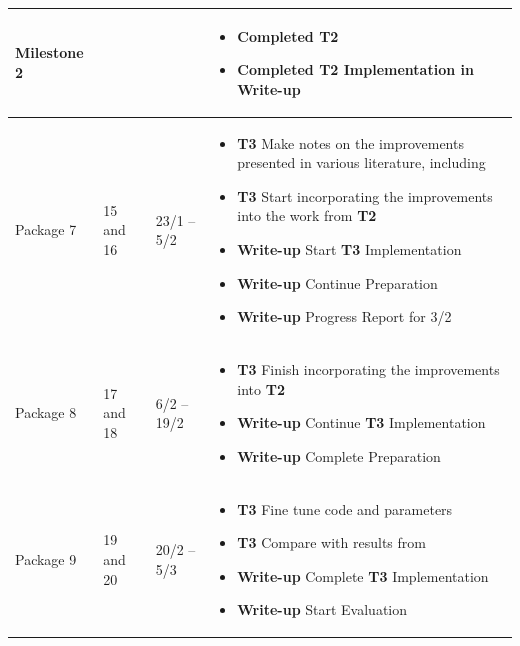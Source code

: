\documentclass{article}
\begin{document}
\begin{longtable}{p{2.5cm}p{1.5cm}P{2.5cm}P{6.8cm}}
    \textbf{Milestone 2} &
    &
    &
    \begin{itemize}[label={--},noitemsep,leftmargin=*,topsep=0pt,partopsep=0pt]
      \item Completed \textbf{T2}
      \item Completed \textbf{T2} Implementation in \textbf{Write-up}
    \end{itemize}\\
    \hline
    
    Package 7 &
    15 and 16  &
    23/1 -- 5/2 &
    \begin{itemize}[label={--},noitemsep,leftmargin=*,topsep=0pt,partopsep=0pt]
      \item \textbf{T3} Make notes on the improvements presented in various literature, including \cite{Nichol-2021}
      \item \textbf{T3} Start incorporating the improvements into the work from \textbf{T2}
      \item \textbf{Write-up} Start \textbf{T3} Implementation
      \item \textbf{Write-up} Continue Preparation
      \item \textbf{Write-up} Progress Report for 3/2
    \end{itemize}\\
    \hline
    
    Package 8 &
    17 and 18  &
    6/2 -- 19/2 &
    \begin{itemize}[label={--},noitemsep,leftmargin=*,topsep=0pt,partopsep=0pt]
      \item \textbf{T3} Finish incorporating the improvements into \textbf{T2}
      \item \textbf{Write-up} Continue \textbf{T3} Implementation
      \item \textbf{Write-up} Complete Preparation
    \end{itemize}\\
    \hline
    
    Package 9 &
    19 and 20  &
    20/2 -- 5/3 &
    \begin{itemize}[label={--},noitemsep,leftmargin=*,topsep=0pt,partopsep=0pt]
      \item \textbf{T3} Fine tune code and parameters
      \item \textbf{T3} Compare with results from \cite{Saharia-2022}
      \item \textbf{Write-up} Complete \textbf{T3} Implementation
      \item \textbf{Write-up} Start Evaluation
    \end{itemize}\\
    \hline


\end{longtable}
\end{document}

